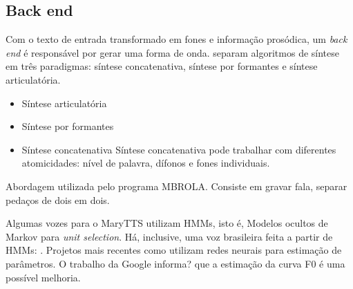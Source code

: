 \subsection{Back end}
Com o texto de entrada transformado em fones e informação prosódica, um
\emph{back end} é responsável por gerar uma forma de onda.
 separam algoritmos de síntese em três paradigmas:
síntese concatenativa, síntese por formantes e síntese articulatória. 

\begin{itemize}
\item Síntese articulatória
\item Síntese por formantes
\item Síntese concatenativa
Síntese concatenativa pode trabalhar com diferentes atomicidades: nível de palavra,
dífonos e fones individuais.
\end{itemize}



Abordagem utilizada pelo programa MBROLA. Consiste em gravar fala, separar
pedaços de dois em dois.

Algumas vozes para o MaryTTS \cite{marytts} utilizam HMMs, isto é, Modelos
ocultos de Markov para \emph{unit selection}. Há, inclusive, uma voz brasileira
feita a partir de HMMs: \cite{couto}.
Projetos mais recentes como \cite{merlin,dnngoogle} utilizam redes neurais para
estimação de parâmetros. O trabalho da Google informa? que a estimação da curva
F0 é uma possível melhoria.
